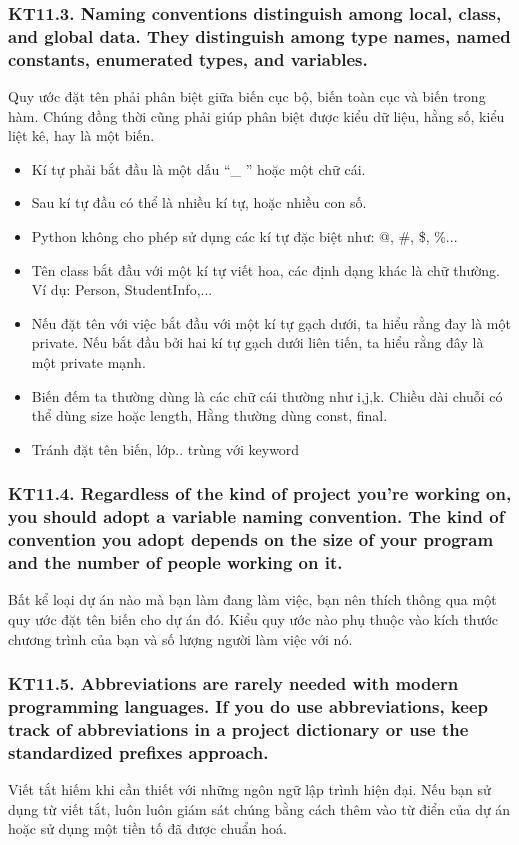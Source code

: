 \documentclass[12pt]{report}
\begin{document}
\subsubsection{KT11.3. Naming conventions distinguish among local, class, and global data. They distinguish among type names, named constants, enumerated types, and variables.}
Quy ước đặt tên phải phân biệt giữa biến cục bộ, biến toàn cục và biến trong hàm. Chúng đồng thời cũng phải giúp phân biệt được kiểu dữ liệu, hằng số, kiểu liệt kê, hay là một biến. 
\vspace*{3mm}
\begin{itemize}
	\item Kí tự phải bắt đầu là một dấu “\_ ” hoặc một chữ cái.
	\item Sau kí tự đầu có thể là nhiều kí tự, hoặc nhiều con số.
	\item Python không cho phép sử dụng các kí tự đặc biệt như: @, \#, \$, \%...
	\item Tên class bắt đầu với một  kí tự viết hoa, các định dạng khác là chữ thường. Ví dụ: Person, StudentInfo,...
	\item Nếu đặt tên với việc bắt đầu với một kí tự gạch dưới, ta hiểu rằng đay là một private. Nếu bắt đầu bởi hai kí tự gạch dưới liên tiến, ta hiểu rằng đây là một private mạnh.
	\item Biến đếm ta thường dùng là các chữ cái thường như i,j,k. Chiều dài chuỗi có thể dùng size hoặc length, Hằng thường dùng const, final.
	\item Tránh đặt tên biến, lớp.. trùng với keyword 
\end{itemize}

\subsubsection{KT11.4. Regardless of the kind of project you're working on, you should adopt a variable naming convention. The kind of convention you adopt depends on the size of your program and the number of people working on it.}
Bất kể loại dự án nào mà bạn làm đang làm việc, bạn nên thích thông qua một quy ước đặt tên biến cho dự án đó. Kiểu quy ước nào phụ thuộc vào kích thước chương trình của bạn và số lượng người làm việc với nó. 


\subsubsection{KT11.5. Abbreviations are rarely needed with modern programming languages. If you do use abbreviations, keep track of abbreviations in a project dictionary or use the standardized prefixes approach.}
Viết tắt hiếm khi cần thiết với những ngôn ngữ lập trình hiện đại. Nếu bạn sử dụng từ viết tắt, luôn luôn giám sát chúng bằng cách thêm vào từ điển của dự án hoặc sử dụng một tiền tố đã được chuẩn hoá. 
\vspace*{3mm}
\end{document}
